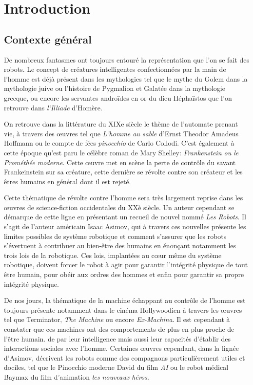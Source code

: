\documentclass[a4paper,11pt,twoside]{StyleThese}
\begin{document}
\fi


\chapter*{Introduction}
\minitoc

\section{Contexte général}
De nombreux fantasmes ont toujours entouré la représentation que l'on se fait des robots. Le concept de créatures intelligentes confectionnées par la main de l'homme est déjà présent dans les mythologies tel que le mythe du Golem dans la mythologie juive ou l'histoire de Pygmalion et Galatée dans la mythologie grecque, ou encore les servantes androïdes en or du dieu Héphaïstos que l'on retrouve dans \textit{l'Illiade} d'Homère.

On retrouve dans la littérature du XIXe siècle le thème de l'automate prenant vie, à travers des œuvres tel que \textit{L'homme au sable} d'Ernst Theodor Amadeus Hoffmann ou le compte de fées \textit{pinocchio} de Carlo Collodi. C'est également à cette époque qu'est paru le célèbre roman de Mary Shelley: \textit{Frankenstein ou le Prométhée moderne}. Cette œuvre met en scène la perte de contrôle du savant Frankeinstein sur sa créature, cette dernière se révolte contre son créateur et les êtres humains en général dont il est rejeté. 

Cette thématique de révolte contre l'homme sera très largement reprise dans les œuvres de science-fiction occidentales du XXè siècle. Un auteur cependant se démarque de cette ligne en présentant un recueil de nouvel nommé \textit{Les Robots}. Il s'agit de l'auteur américain Isaac Asimov, qui à travers ces nouvelles présente les limites possibles de système robotique et comment s'assurer que les robots s'évertuent à contribuer au bien-être des humains en énonçant notamment les trois lois de la robotique. Ces lois, implantées au cœur même du système robotique, doivent forcer le robot à agir pour garantir l'intégrité physique de tout être humain, pour obéir aux ordres des hommes et enfin pour garantir sa propre intégrité physique.

De nos jours, la thématique de la machine échappant au contrôle de l'homme est toujours présente notamment dans le cinéma Hollywoodien à travers les œuvres tel que Terminator, \textit{The Machine} ou encore \textit{Ex-Machina}. Il est cependant à constater que ces machines ont des comportements de plus en plus proche de l'être humain.  de par leur intelligence mais aussi leur capacités d'établir des interactions sociales  avec l'homme.
Certaines œuvres cependant, dans la lignée d'Asimov, décrivent les robots comme des compagnons particulièrement utiles et dociles, tel que le Pinocchio moderne David du film \textit{AI} ou le robot médical Baymax du film d'animation \textit{les nouveaux héros}.
\end{document}
